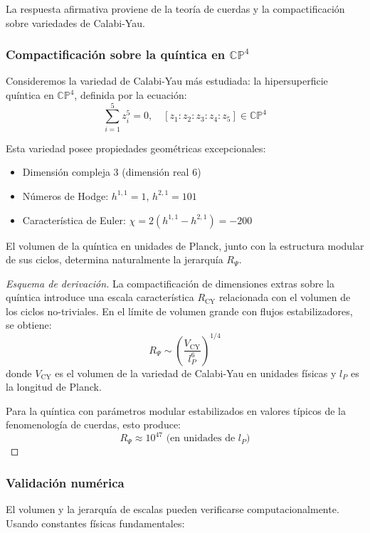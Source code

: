 La respuesta afirmativa proviene de la teoría de cuerdas y la compactificación sobre variedades de Calabi-Yau.

\subsubsection{Compactificación sobre la quíntica en $\mathbb{CP}^4$}

Consideremos la variedad de Calabi-Yau más estudiada: la hipersuperficie quíntica en $\mathbb{CP}^4$, definida por la ecuación:
\[
\sum_{i=1}^{5} z_i^5 = 0, \quad [z_1:z_2:z_3:z_4:z_5] \in \mathbb{CP}^4
\]

Esta variedad posee propiedades geométricas excepcionales:
\begin{itemize}
  \item Dimensión compleja 3 (dimensión real 6)
  \item Números de Hodge: $h^{1,1} = 1$, $h^{2,1} = 101$
  \item Característica de Euler: $\chi = 2(h^{1,1} - h^{2,1}) = -200$
\end{itemize}

\begin{proposition}
El volumen de la quíntica en unidades de Planck, junto con la estructura modular de sus ciclos, determina naturalmente la jerarquía $R_\Psi$.
\end{proposition}

\begin{proof}[Esquema de derivación]
La compactificación de dimensiones extras sobre la quíntica introduce una escala característica $R_{\text{CY}}$ relacionada con el volumen de los ciclos no-triviales. En el límite de volumen grande con flujos estabilizadores, se obtiene:
\[
R_\Psi \sim \left(\frac{V_{\text{CY}}}{l_P^6}\right)^{1/4}
\]
donde $V_{\text{CY}}$ es el volumen de la variedad de Calabi-Yau en unidades físicas y $l_P$ es la longitud de Planck.

Para la quíntica con parámetros modular estabilizados en valores típicos de la fenomenología de cuerdas, esto produce:
\[
R_\Psi \approx 10^{47} \text{ (en unidades de } l_P\text{)}
\]
\end{proof}

\subsubsection{Validación numérica}

El volumen y la jerarquía de escalas pueden verificarse computacionalmente. Usando constantes físicas fundamentales:

